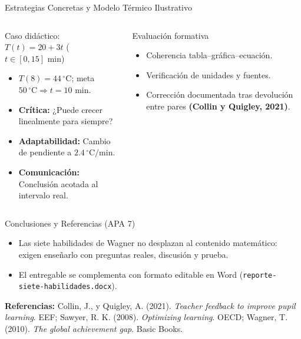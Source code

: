 \documentclass[aspectratio=169,spanish,xcolor=table]{beamer}
\begin{document}
\begin{frame}{Estrategias Concretas y Modelo Térmico Ilustrativo}
  \begin{columns}[T]
      \begin{block}{Caso didáctico: $T(t) = 20 + 3t$ ($t\in[0,15]\text{ min}$)}
        \begin{itemize}\scriptsize
          \item $T(8)=44\,^\circ\text{C}$; meta $50\,^\circ\text{C}\Rightarrow t=10\text{ min}$.
          \item \textbf{Crítica:} ¿Puede crecer linealmente para siempre?
          \item \textbf{Adaptabilidad:} Cambio de pendiente a $2.4\,^\circ\text{C/min}$.
          \item \textbf{Comunicación:} Conclusión acotada al intervalo real.
        \end{itemize}
      \end{block}
      \begin{block}{Evaluación formativa}
        \begin{itemize}\scriptsize
          \item Coherencia tabla--gráfica--ecuación.
          \item Verificación de unidades y fuentes.
          \item Corrección documentada tras devolución entre pares \textbf{(Collin y Quigley, 2021)}.
        \end{itemize}
      \end{block}
  \end{columns}
\end{frame}

\begin{frame}{Conclusiones y Referencias (APA 7)}
  \begin{itemize}\small
    \item Las siete habilidades de Wagner no desplazan al contenido matemático: exigen enseñarlo con preguntas reales, discusión y prueba.
    \item El entregable se complementa con formato editable en Word (\texttt{reporte-siete-habilidades.docx}).
  \end{itemize}
  \vspace{0.3cm}
  \scriptsize
  \textbf{Referencias:} Collin, J., y Quigley, A. (2021). \textit{Teacher feedback to improve pupil learning}. EEF; Sawyer, R. K. (2008). \textit{Optimizing learning}. OECD; Wagner, T. (2010). \textit{The global achievement gap}. Basic Books.
\end{frame}
\end{document}
